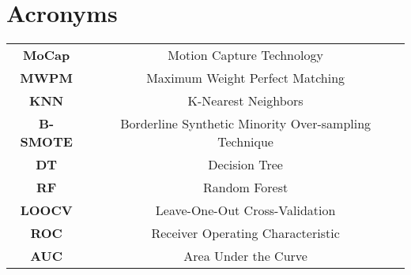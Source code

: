 \section*{\Huge Acronyms}



\begin{table}[H]
    \begin{tabular}{c c}
        \textbf{MoCap} & Motion Capture Technology \\
        \textbf{MWPM} & Maximum Weight Perfect Matching \\
        \textbf{KNN} & K-Nearest Neighbors \\
        \textbf{B-SMOTE} & Borderline Synthetic Minority Over-sampling Technique \\
        \textbf{DT} & Decision Tree \\
        \textbf{RF} & Random Forest \\
        \textbf{LOOCV} & Leave-One-Out Cross-Validation \\
        \textbf{ROC} & Receiver Operating Characteristic \\
        \textbf{AUC} & Area Under the Curve \\
    \end{tabular}
\end{table}

